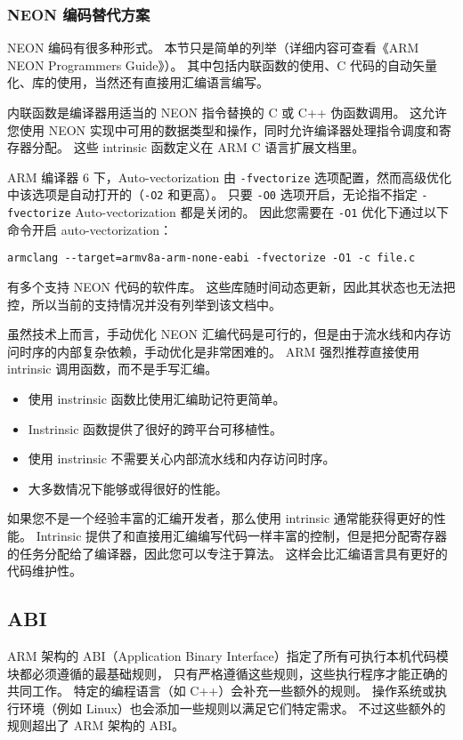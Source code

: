 \subsubsection{NEON 编码替代方案}

NEON 编码有很多种形式。
本节只是简单的列举（详细内容可查看《ARM NEON Programmers Guide》）。
其中包括内联函数的使用、C 代码的自动矢量化、库的使用，当然还有直接用汇编语言编写。

内联函数是编译器用适当的 NEON 指令替换的 C 或 C++ 伪函数调用。
这允许您使用 NEON 实现中可用的数据类型和操作，同时允许编译器处理指令调度和寄存器分配。
这些 intrinsic 函数定义在 ARM C 语言扩展文档里。

ARM 编译器 6 下，Auto-vectorization 由 \lstinline!-fvectorize! 选项配置，然而高级优化中该选项是自动打开的（\lstinline!-O2! 和更高）。
只要 \lstinline!-O0! 选项开启，无论指不指定 \lstinline!-fvectorize! Auto-vectorization 都是关闭的。
因此您需要在 \lstinline!-O1! 优化下通过以下命令开启 auto-vectorization：

\lstinline!armclang --target=armv8a-arm-none-eabi -fvectorize -O1 -c file.c!

有多个支持 NEON 代码的软件库。
这些库随时间动态更新，因此其状态也无法把控，所以当前的支持情况并没有列举到该文档中。

虽然技术上而言，手动优化 NEON 汇编代码是可行的，但是由于流水线和内存访问时序的内部复杂依赖，手动优化是非常困难的。
ARM 强烈推荐直接使用 intrinsic 调用函数，而不是手写汇编。

\begin{itemize}
  \item 使用 instrinsic 函数比使用汇编助记符更简单。
  \item Instrinsic 函数提供了很好的跨平台可移植性。
  \item 使用 instrinsic 不需要关心内部流水线和内存访问时序。
  \item 大多数情况下能够或得很好的性能。
\end{itemize}

如果您不是一个经验丰富的汇编开发者，那么使用 intrinsic 通常能获得更好的性能。
Intrinsic 提供了和直接用汇编编写代码一样丰富的控制，但是把分配寄存器的任务分配给了编译器，因此您可以专注于算法。
这样会比汇编语言具有更好的代码维护性。

\subsection{ABI}

ARM 架构的 ABI（Application Binary Interface）指定了所有可执行本机代码模块都必须遵循的最基础规则，
只有严格遵循这些规则，这些执行程序才能正确的共同工作。
特定的编程语言（如 C++）会补充一些额外的规则。
操作系统或执行环境（例如 Linux）也会添加一些规则以满足它们特定需求。
不过这些额外的规则超出了 ARM 架构的 ABI。

